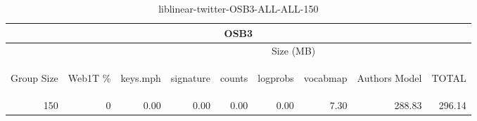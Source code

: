 \begin{center}
\begin{table}[htbp]
\begin{tabular}{ | r | r | r | r | r | r | r | r | r |}
\hline
\multicolumn{9}{|c|}{OSB3}\\
\hline
 & & \multicolumn{7}{|c|}{Size (MB)}\\ \cline{3-9}
\begin{sideways}Group Size\end{sideways} & \begin{sideways}Web1T \% \end{sideways} & \begin{sideways}keys.mph\end{sideways} & \begin{sideways}signature\end{sideways} & \begin{sideways}counts\end{sideways} & \begin{sideways}logprobs\end{sideways} & \begin{sideways}vocabmap\end{sideways} & \begin{sideways}Authors Model \end{sideways} & \begin{sideways}TOTAL\end{sideways}\\
\hline
\multirow{0}{*}{150}
 & 0 & 0.00 & 0.00 & 0.00 & 0.00 & 7.30 & 288.83 & 296.14\\ \cline{2-9}
\hline
\end{tabular}
\caption{liblinear-twitter-OSB3-ALL-ALL-150}
\label{table:liblinear-twitter-OSB3-ALL-ALL-150}
\end{table}
\end{center}

